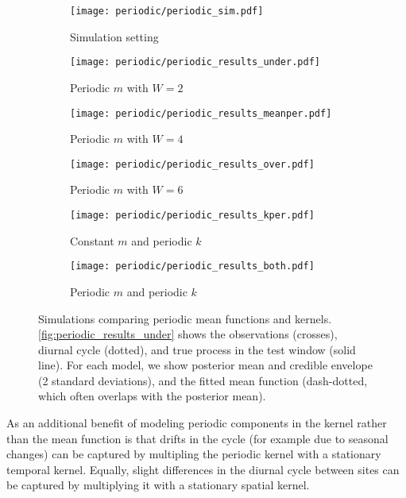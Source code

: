 \begin{figure}
    \centering
    \begin{subfigure}[t]{0.32\textwidth}
    \texttt{[image: periodic/periodic\_sim.pdf]}
    \caption{Simulation setting}
    \label{fig:periodic_sim}
    \end{subfigure}
    \begin{subfigure}[t]{0.32\textwidth}
    \texttt{[image: periodic/periodic\_results\_under.pdf]}
    \caption{Periodic $m$ with $W=2$}
    \label{fig:periodic_results_under}
    \end{subfigure}
    \begin{subfigure}[t]{0.32\textwidth}
    \texttt{[image: periodic/periodic\_results\_meanper.pdf]}
    \caption{Periodic $m$ with $W=4$}
    \label{fig:periodic_results_meanper}
    \end{subfigure}
    \begin{subfigure}[t]{0.32\textwidth}
    \texttt{[image: periodic/periodic\_results\_over.pdf]}
    \caption{Periodic $m$ with $W=6$}
    \label{fig:periodic_results_over}
    \end{subfigure}
    \begin{subfigure}[t]{0.32\textwidth}
    \texttt{[image: periodic/periodic\_results\_kper.pdf]}
    \caption{Constant $m$ and periodic $k$}
    \label{fig:periodic_results_kper}
    \end{subfigure}
    \begin{subfigure}[t]{0.32\textwidth}
    \texttt{[image: periodic/periodic\_results\_both.pdf]}
    \caption{Periodic $m$ and periodic $k$}
    \label{fig:periodic_results_both}
    \end{subfigure}
\caption{\label{fig:periodic_results}
    Simulations comparing periodic mean functions and kernels.
    \autoref{fig:periodic_results_under} shows the observations (crosses), diurnal cycle (dotted),
    and true process in the test window (solid line).
    For each model, we show posterior mean and credible envelope (2 standard deviations),
    and the fitted mean function (dash-dotted, which often overlaps with the posterior mean).
}
\end{figure}

As an additional benefit of modeling periodic components in the kernel rather than the mean function is that drifts in the cycle (for example due to seasonal changes)
can be captured by multipling the periodic kernel with a stationary temporal kernel.
Equally, slight differences in the diurnal cycle between sites can be captured by multiplying it with a stationary spatial kernel.
